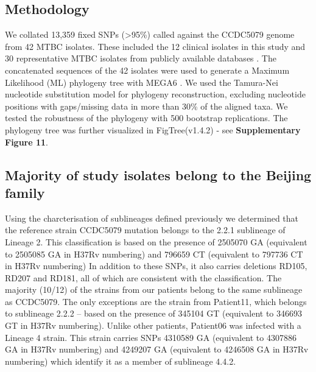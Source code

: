 \documentclass[12pt, oneside]{article}   	%
\begin{document}
\subsection{Methodology}
We collated 13,359 fixed SNPs (>95\%) called against the CCDC5079 genome from 42 MTBC isolates. These included the 12 clinical isolates in this study and 30 representative MTBC isolates from publicly available databases \cite{Comas_tree}. The concatenated sequences of the 42 isolates were used to generate a Maximum Likelihood (ML) phylogeny tree with MEGA6 \cite{MEGA}. We used the Tamura-Nei nucleotide substitution model for phylogeny reconstruction, excluding nucleotide positions with gaps/missing data in more than 30\% of the aligned taxa. We tested the robustness of the phylogeny with 500 bootstrap replications. The phylogeny tree was further visualized in FigTree(v1.4.2) - see \textbf{Supplementary Figure 11}.

\subsection{Majority of study isolates belong to the Beijing family}
Using the charcterisation of sublineages defined previously \cite{COLL} we determined that the reference strain CCDC5079 mutation belongs to the 2.2.1 sublineage of Lineage 2. This classification is based on the presence of 2505070 GA (equivalent to 2505085 GA in H37Rv numbering) and 796659 CT (equivalent to 797736 CT in H37Rv numbering)  In addition to these SNPs, it also carries deletions RD105, RD207 and RD181, all of which are consistent with the classification. The majority (10/12) of the strains from our patients belong to the same sublineage as CCDC5079. The only exceptions are the strain from Patient11, which belongs to sublineage 2.2.2 -- based on the presence of 345104 GT (equivalent to 346693 GT in H37Rv numbering).
Unlike other patients, Patient06 was infected with a Lineage 4 strain. This strain carries SNPs 4310589 GA (equivalent to 4307886 GA in H37Rv numbering) and 4249207 GA (equivalent to 4246508 GA in H37Rv numbering) which identify it as a member of sublineage 4.4.2.
\end{document}
